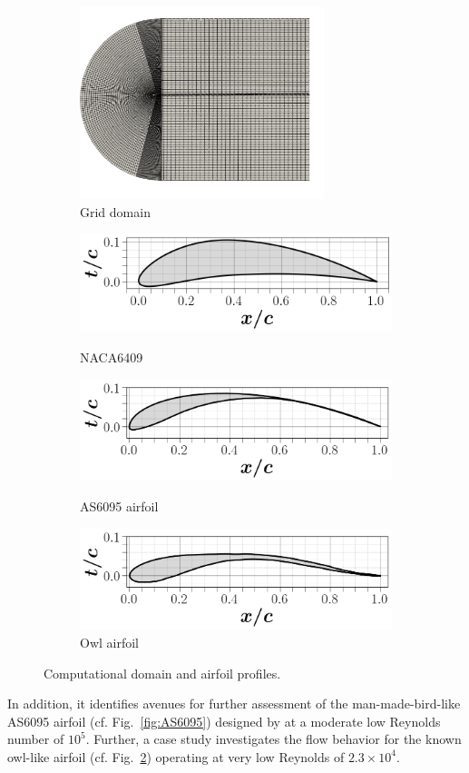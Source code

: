 \documentclass[conf]{new-aiaa}
\begin{document}
\begin{figure}[ht!]
\centering
\begin{subfigure}{.4\textwidth}
\includegraphics[width=2.8in]{Figures/mesh fluid.png}
\caption{\label{fig:Griddomain} Grid domain}
\label{fig:airfoildesigna}
\end{subfigure}
\begin{subfigure}{.4\textwidth}
\includegraphics[width=.6\columnwidth]{Figures/naca_airfoil.png}
\caption{\label{fig:6409}NACA6409}
\includegraphics[width=.6\columnwidth]{Figures/AS9065_airfoil.png}
\caption{\label{fig:AS6095}AS6095 airfoil \cite{ananda2018design}}
\includegraphics[width=.6\columnwidth]{Figures/owl_airfoil.png}
\caption{\label{fig:owl}Owl airfoil \cite{liu2004avian}}
\end{subfigure}
\caption{Computational domain and airfoil profiles.}
\label{fig:Ggeometry}
\end{figure}
%
In addition, it identifies avenues for further assessment of the man-made-bird-like AS6095 airfoil (cf. Fig.~\ref{fig:AS6095}) designed by \citet{ananda2018design} at a moderate low Reynolds number of $10^5$. Further,  a case study investigates the flow behavior for the known owl-like airfoil (cf. Fig.~\ref{fig:owl}) operating at very low Reynolds of $2.3\times 10^4$.
\end{document}
